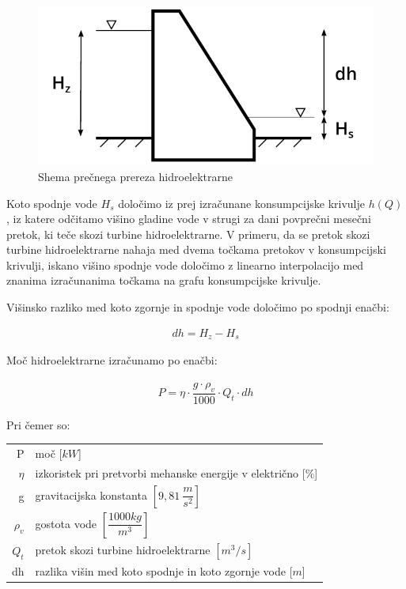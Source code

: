\begin{figure}[ht!]
	\begin{centering}
		\includegraphics{slike/electricityProduction/powerplant_crossSection.pdf}
		\caption{Shema prečnega prereza hidroelektrarne}
	\end{centering}
\end{figure}

 Koto spodnje vode $H_s$ določimo iz prej izračunane konsumpcijske krivulje $h(Q)$, iz katere odčitamo višino gladine vode v strugi za dani povprečni mesečni pretok, ki teče skozi turbine hidroelektrarne. V primeru, da se pretok skozi turbine hidroelektrarne nahaja med dvema točkama pretokov v konsumpcijski krivulji, iskano višino spodnje vode določimo z linearno interpolacijo med znanima izračunanima točkama na grafu konsumpcijske krivulje.


Višinsko razliko med koto zgornje in spodnje vode določimo po spodnji enačbi:

\begin{ceqn}
\begin{align}
dh = H_z - H_s
\end{align}
\end{ceqn}


\pagebreak

Moč hidroelektrarne izračunamo po enačbi:

\begin{ceqn}
\begin{align}
P = \eta \cdot \dfrac{g \cdot \rho_v}{1000} \cdot Q_t \cdot dh \label{eq:mocHidroelektrarne}
\end{align}
\end{ceqn}

Pri čemer so:
\begin{table}[htb!]
	\begin{tabular}{r|p{10cm}}
		P & moč [$kW$]\\
		$\eta$ & izkoristek pri pretvorbi mehanske energije v električno [\%]\\
		g & gravitacijska konstanta $\left[9,81~\dfrac{m}{s^{2}}\right]$ \\
		$\rho_v$&gostota vode $\left[\dfrac{1000 kg}{m^3}\right]$\\
		$Q_t$ & pretok skozi turbine hidroelektrarne $\left[m^{3}/s \right]$\\
		dh & razlika višin med koto spodnje in koto zgornje vode [$m$]
	\end{tabular}
\end{table}



